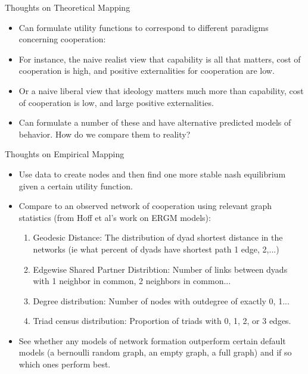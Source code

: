 \documentclass{beamer}
\begin{document}
\begin{frame}{Thoughts on Theoretical Mapping}
\begin{itemize}
\item Can formulate utility functions to correspond to different paradigms concerning cooperation:
\item For instance, the naive realist view that capability is all that matters, cost of cooperation is high, and positive externalities for cooperation are low.
\item Or a naive liberal view that ideology matters much more than capability, cost of cooperation is low, and large positive externalities.
\item Can formulate a number of these and have alternative predicted models of behavior. How do we compare them to reality?
\end{itemize}
\end{frame}

\begin{frame}{Thoughts on Empirical Mapping}
\begin{itemize}
\item Use data to create nodes and then find one more stable nash equilibrium given a certain utility function.
\item Compare to an observed network of cooperation using relevant graph statistics (from Hoff et al's work on ERGM models):
\begin{enumerate}
\item Geodesic Distance: The distribution of dyad shortest distance in the networks (ie what percent of dyads have shortest path 1 edge, 2,...)
\item Edgewise Shared Partner Distribtion: Number of links between dyads with 1 neighbor in common, 2 neighbors in common...
\item Degree distribution: Number of nodes with outdegree of exactly 0, 1...
\item Triad census distribution: Proportion of triads with 0, 1, 2,  or 3 edges.
\end{enumerate}
\item See whether any models of network formation outperform certain default models (a bernoulli random graph, an empty graph, a full graph) and if so which ones perform best.
\end{itemize}
\end{frame}
\end{document}

